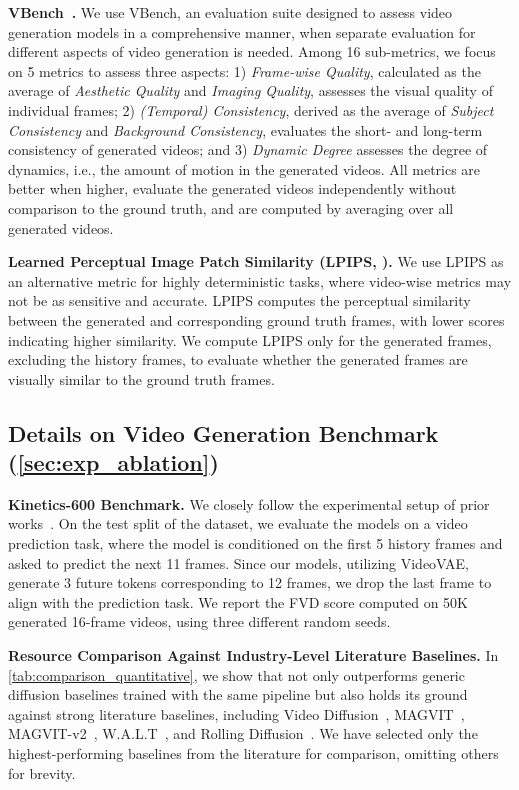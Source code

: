 \textbf{VBench~\cite{huang2024vbench}.} We use VBench, an evaluation suite designed to assess video generation models in a comprehensive manner, when separate evaluation for different aspects of video generation is needed. Among 16 sub-metrics, we focus on 5 metrics to assess three aspects: 1) \emph{Frame-wise Quality}, calculated as the average of \emph{Aesthetic Quality} and \emph{Imaging Quality}, assesses the visual quality of individual frames; 2) \emph{(Temporal) Consistency}, derived as the average of \emph{Subject Consistency} and \emph{Background Consistency}, evaluates the short- and long-term consistency of generated videos; and 3) \emph{Dynamic Degree} assesses the degree of dynamics, i.e., the amount of motion in the generated videos. All metrics are better when higher, evaluate the generated videos independently without comparison to the ground truth, and are computed by averaging over all generated videos.

\textbf{Learned Perceptual Image Patch Similarity (LPIPS, \citet{zhang2018unreasonable}).} We use LPIPS as an alternative metric for highly deterministic tasks, where video-wise metrics may not be as sensitive and accurate. LPIPS computes the perceptual similarity between the generated and corresponding ground truth frames, with lower scores indicating higher similarity. We compute LPIPS only for the generated frames, excluding the history frames, to evaluate whether the generated frames are visually similar to the ground truth frames.

\subsection{Details on Video Generation Benchmark (\cref{sec:exp_ablation})}
\label{app:exp_details_benchmarks}

\textbf{Kinetics-600 Benchmark.} We closely follow the experimental setup of prior works~\cite{ho2022video, yu2023magvit, yu2023language, ruhe2024rolling}. On the test split of the dataset, we evaluate the models on a video prediction task, where the model is conditioned on the first 5 history frames and asked to predict the next 11 frames. Since our models, utilizing VideoVAE, generate 3 future tokens corresponding to 12 frames, we drop the last frame to align with the prediction task. We report the FVD score computed on 50K generated 16-frame videos, using three different random seeds.

\textbf{Resource Comparison Against Industry-Level Literature Baselines.} In \cref{tab:comparison_quantitative}, we show that \mtd not only outperforms generic diffusion baselines trained with the same pipeline but also holds its ground against strong literature baselines, including Video Diffusion~\cite{ho2022video}, MAGVIT~\cite{yu2023magvit}, MAGVIT-v2~\cite{yu2023language}, W.A.L.T~\cite{gupta2023photorealistic}, and Rolling Diffusion~\cite{ruhe2024rolling}. We have selected only the highest-performing baselines from the literature for comparison, omitting others for brevity.

